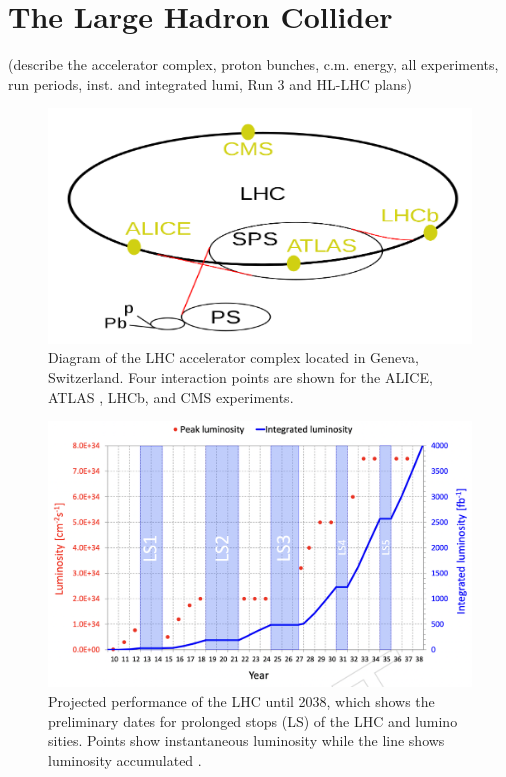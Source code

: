 \section{The Large Hadron Collider}
\label{sec:lhc}
(describe the accelerator complex, proton bunches, c.m. energy, all experiments, run periods, inst. and integrated lumi, Run 3 and HL-LHC plans)

\begin{figure}[H]
  \centering
  \includegraphics[width=0.7\columnwidth]{./LHCcomplex.png}
  \caption{Diagram of the LHC accelerator complex located in Geneva, Switzerland. Four interaction points are shown for the ALICE, ATLAS
, LHCb, and CMS experiments.}
  \label{fig:LHC}
\end{figure}


\begin{figure}[H]
  \centering
  \includegraphics[width=0.8\columnwidth]{./HLLHCLumi.png}
  \caption{Projected performance of the LHC until 2038, which shows the preliminary dates for prolonged stops (LS) of the LHC and lumino
sities. Points show instantaneous luminosity while the line shows luminosity accumulated \cite{collaborations2019report}.}
  \label{fig:LHCPlans}
\end{figure}
